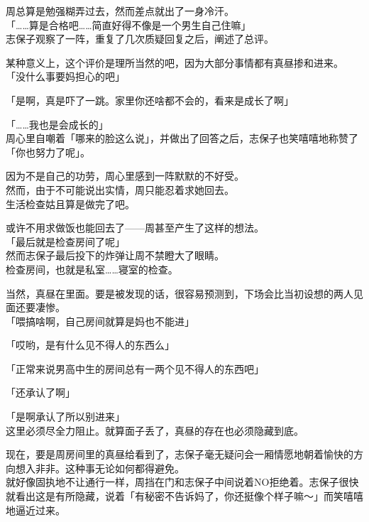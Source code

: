 周总算是勉强糊弄过去，然而差点就出了一身冷汗。\\

「……算是合格吧……简直好得不像是一个男生自己住嘛」\\

志保子观察了一阵，重复了几次质疑回复之后，阐述了总评。

某种意义上，这个评价是理所当然的吧，因为大部分事情都有真昼掺和进来。\\

「没什么事要妈担心的吧」

「是啊，真是吓了一跳。家里你还啥都不会的，看来是成长了啊」

「……我也是会成长的」\\

周心里自嘲着「哪来的脸这么说」，并做出了回答之后，志保子也笑嘻嘻地称赞了「你也努力了呢」。

因为不是自己的功劳，周心里感到一阵默默的不好受。\\

然而，由于不可能说出实情，周只能忍着求她回去。\\

生活检查姑且算是做完了吧。

或许不用求做饭也能回去了——周甚至产生了这样的想法。\\

「最后就是检查房间了呢」\\

然而志保子最后投下的炸弹让周不禁瞪大了眼睛。\\

检查房间，也就是私室……寝室的检查。

当然，真昼在里面。要是被发现的话，很容易预测到，下场会比当初设想的两人见面还要凄惨。\\

「喂搞啥啊，自己房间就算是妈也不能进」

「哎哟，是有什么见不得人的东西么」

「正常来说男高中生的房间总有一两个见不得人的东西吧」

「还承认了啊」

「是啊承认了所以别进来」\\

这里必须尽全力阻止。就算面子丢了，真昼的存在也必须隐藏到底。

现在，要是周房间里的真昼给看到了，志保子毫无疑问会一厢情愿地朝着愉快的方向想入非非。这种事无论如何都得避免。\\

就好像固执地不让通行一样，周挡在门和志保子中间说着NO拒绝着。志保子很快就看出这是有所隐藏，说着「有秘密不告诉妈了，你还挺像个样子嘛～」而笑嘻嘻地逼近过来。\\

